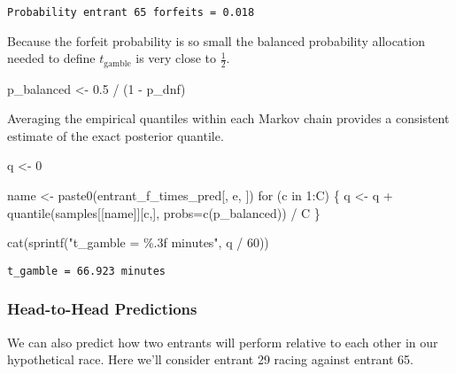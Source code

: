\documentclass[
  letterpaper,
  DIV=11,
  numbers=noendperiod]{scrartcl}
\newenvironment{Shaded}{\begin{snugshade}}{\end{snugshade}}
\newcommand{\AttributeTok}[1]{\textcolor[rgb]{0.40,0.45,0.13}{#1}}
\newcommand{\ControlFlowTok}[1]{\textcolor[rgb]{0.00,0.23,0.31}{#1}}
\newcommand{\DecValTok}[1]{\textcolor[rgb]{0.68,0.00,0.00}{#1}}
\newcommand{\FloatTok}[1]{\textcolor[rgb]{0.68,0.00,0.00}{#1}}
\newcommand{\FunctionTok}[1]{\textcolor[rgb]{0.28,0.35,0.67}{#1}}
\newcommand{\NormalTok}[1]{\textcolor[rgb]{0.00,0.23,0.31}{#1}}
\newcommand{\OtherTok}[1]{\textcolor[rgb]{0.00,0.23,0.31}{#1}}
\newcommand{\SpecialCharTok}[1]{\textcolor[rgb]{0.37,0.37,0.37}{#1}}
\newcommand{\StringTok}[1]{\textcolor[rgb]{0.13,0.47,0.30}{#1}}
\begin{document}
\begin{verbatim}
Probability entrant 65 forfeits = 0.018
\end{verbatim}

Because the forfeit probability is so small the balanced probability
allocation needed to define \(t_{\mathrm{gamble}}\) is very close to
\(\frac{1}{2}\).

\begin{Shaded}
\begin{Highlighting}[]
\NormalTok{p\_balanced }\OtherTok{\textless{}{-}} \FloatTok{0.5} \SpecialCharTok{/}\NormalTok{ (}\DecValTok{1} \SpecialCharTok{{-}}\NormalTok{ p\_dnf)}
\end{Highlighting}
\end{Shaded}

Averaging the empirical quantiles within each Markov chain provides a
consistent estimate of the exact posterior quantile.

\begin{Shaded}
\begin{Highlighting}[]
\NormalTok{q }\OtherTok{\textless{}{-}} \DecValTok{0}

\NormalTok{name }\OtherTok{\textless{}{-}} \FunctionTok{paste0}\NormalTok{(}\StringTok{\textquotesingle{}entrant\_f\_times\_pred[\textquotesingle{}}\NormalTok{, e, }\StringTok{\textquotesingle{}]\textquotesingle{}}\NormalTok{)}
\ControlFlowTok{for}\NormalTok{ (c }\ControlFlowTok{in} \DecValTok{1}\SpecialCharTok{:}\NormalTok{C) \{}
\NormalTok{  q }\OtherTok{\textless{}{-}}\NormalTok{ q }\SpecialCharTok{+} \FunctionTok{quantile}\NormalTok{(samples[[name]][c,], }\AttributeTok{probs=}\FunctionTok{c}\NormalTok{(p\_balanced)) }\SpecialCharTok{/}\NormalTok{ C}
\NormalTok{\}}

\FunctionTok{cat}\NormalTok{(}\FunctionTok{sprintf}\NormalTok{(}\StringTok{"t\_gamble = \%.3f minutes"}\NormalTok{, q }\SpecialCharTok{/} \DecValTok{60}\NormalTok{))}
\end{Highlighting}
\end{Shaded}

\begin{verbatim}
t_gamble = 66.923 minutes
\end{verbatim}

\subsubsection{Head-to-Head Predictions}\label{head-to-head-predictions}

We can also predict how two entrants will perform relative to each other
in our hypothetical race. Here we'll consider entrant 29 racing against
entrant 65.
\end{document}
